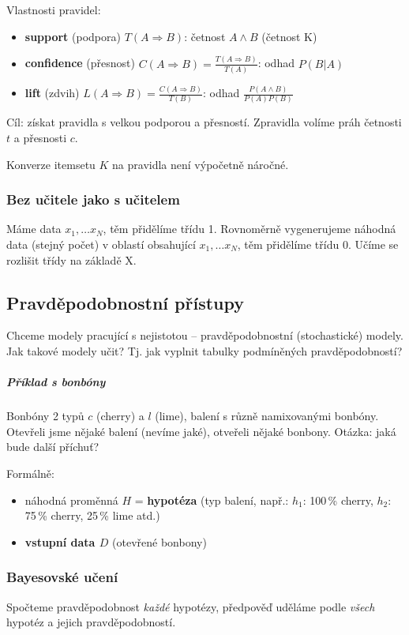\documentclass[11pt]{report} %
\numberwithin{equation}{section}
\begin{document}
Vlastnosti pravidel:
\begin{itemize}
\item \textbf{support} (podpora) $T(A\Rightarrow B)$: četnost $A \wedge B$ (četnost K)
\item \textbf{confidence} (přesnost) $C(A\Rightarrow B) = \frac{T(A\Rightarrow B)}{T(A)}$: odhad $P(B|A)$
\item \textbf{lift} (zdvih) $L(A\Rightarrow B) = \frac{C(A\Rightarrow B)}{T(B)}$: odhad $\frac{P(A \wedge B)}{P(A)P(B)}$
\end{itemize}

Cíl: získat pravidla s velkou podporou a přesností. Zpravidla volíme práh četnosti $t$ a přesnosti $c$.

Konverze itemsetu $K$ na pravidla není výpočetně náročné.

\subsubsection{Bez učitele jako s učitelem}
Máme data $x_1,\dots x_N$, těm přidělíme třídu 1. Rovnoměrně vygenerujeme náhodná data (stejný počet) v oblastí obsahující $x_1,\dots x_N$, těm přidělíme třídu 0. Učíme se rozlišit třídy na základě X.


\subsection{Pravděpodobnostní přístupy}
Chceme modely pracující s nejistotou -- pravděpodobnostní (stochastické) modely. Jak takové modely učit? Tj. jak vyplnit tabulky podmíněných pravděpodobností?

\subparagraph{Příklad s bonbóny}
Bonbóny 2 typů $c$ (cherry) a $l$ (lime), balení s různě namixovanými bonbóny. Otevřeli jsme nějaké balení (nevíme jaké), otveřeli nějaké bonbony. Otázka: jaká bude další příchuť?

Formálně: 
\begin{itemize}
	\item náhodná proměnná $H$ = \textbf{hypotéza} (typ balení, např.: $h_1$: 100\,\% cherry, $h_2$: 75\,\% cherry, 25\,\% lime atd.)
	\item \textbf{vstupní data $D$} (otevřené bonbony)
\end{itemize}

\subsubsection{Bayesovské učení}
Spočteme pravděpodobnost \textit{každé} hypotézy, předpověď uděláme podle \textit{všech} hypotéz a jejich pravděpodobností.
\end{document}
